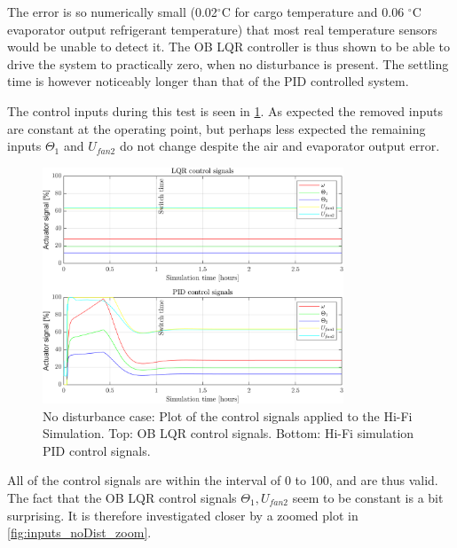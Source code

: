 \noindent The error is so numerically small (0.02$^{\circ}$C for cargo temperature and 0.06 $^{\circ}$C evaporator output refrigerant temperature) that most real temperature sensors would be unable to detect it. The OB LQR controller is thus shown to be able to drive the system to practically zero, when no disturbance is present. The settling time is however noticeably longer than that of the PID controlled system. 

The control inputs during this test is seen in \cref{fig:inputs_noDist}. As expected the removed inputs are constant at the operating point, but perhaps less expected the remaining inputs $\Theta_1$ and $U_{fan2}$ do not change despite the air and evaporator output error.

\begin{figure}[H]
	\centering
	\includegraphics[width=0.8\textwidth]{Graphics/fig_inputs_noDist.png}
	\caption{No disturbance case: Plot of the control signals applied to the Hi-Fi Simulation. Top: OB LQR control signals. Bottom: Hi-Fi simulation PID control signals.}
	\label{fig:inputs_noDist}
\end{figure}
All of the control signals are within the interval of 0 to 100, and are thus valid. The fact that the OB LQR control signals $ \Theta_1, U_{fan2} $ seem to be constant is a bit surprising. It is therefore investigated closer by a zoomed plot in \cref{fig:inputs_noDist_zoom}.


